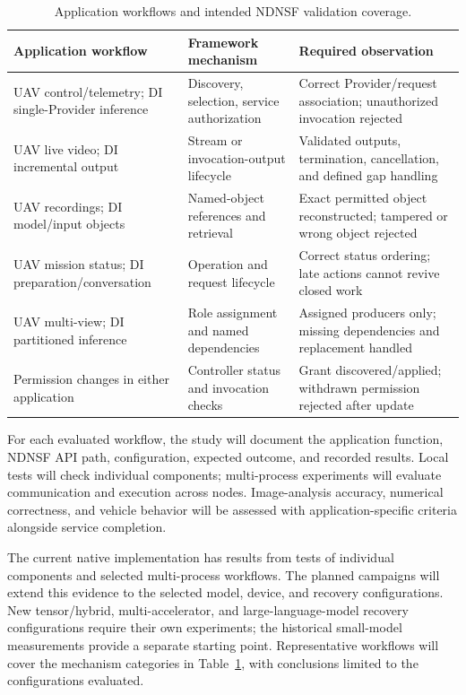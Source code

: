 \begin{table}[htbp]\centering\small
\caption{Application workflows and intended NDNSF validation coverage.}
\label{tab:application-coverage}
\begin{tabularx}{\textwidth}{p{}XX}
\toprule Application workflow & Framework mechanism & Required observation\\\midrule
UAV control/telemetry; DI single-Provider inference & Discovery, selection, service authorization & Correct Provider/request association; unauthorized invocation rejected\\\midrule
UAV live video; DI incremental output & Stream or invocation-output lifecycle & Validated outputs, termination, cancellation, and defined gap handling\\\midrule
UAV recordings; DI model/input objects & Named-object references and retrieval & Exact permitted object reconstructed; tampered or wrong object rejected\\\midrule
UAV mission status; DI preparation/conversation & Operation and request lifecycle & Correct status ordering; late actions cannot revive closed work\\\midrule
UAV multi-view; DI partitioned inference & Role assignment and named dependencies & Assigned producers only; missing dependencies and replacement handled\\\midrule
Permission changes in either application & Controller status and invocation checks & Grant discovered/applied; withdrawn permission rejected after update\\\bottomrule
\end{tabularx}
\end{table}

For each evaluated workflow, the study will document the application function, NDNSF API path, configuration, expected outcome, and recorded results. Local tests will check individual components; multi-process experiments will evaluate communication and execution across nodes. Image-analysis accuracy, numerical correctness, and vehicle behavior will be assessed with application-specific criteria alongside service completion.

The current native implementation has results from tests of individual components and selected multi-process workflows. The planned campaigns will extend this evidence to the selected model, device, and recovery configurations. New tensor/hybrid, multi-accelerator, and large-language-model recovery configurations require their own experiments; the historical small-model measurements provide a separate starting point. Representative workflows will cover the mechanism categories in Table~\ref{tab:application-coverage}, with conclusions limited to the configurations evaluated.

